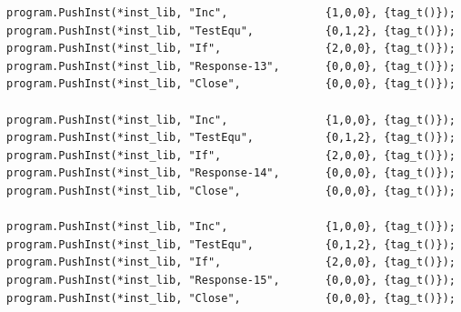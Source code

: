 \documentclass[
]{book}
\begin{document}
\begin{verbatim}
program.PushInst(*inst_lib, "Inc",               {1,0,0}, {tag_t()});
program.PushInst(*inst_lib, "TestEqu",           {0,1,2}, {tag_t()});
program.PushInst(*inst_lib, "If",                {2,0,0}, {tag_t()});
program.PushInst(*inst_lib, "Response-13",       {0,0,0}, {tag_t()});
program.PushInst(*inst_lib, "Close",             {0,0,0}, {tag_t()});

program.PushInst(*inst_lib, "Inc",               {1,0,0}, {tag_t()});
program.PushInst(*inst_lib, "TestEqu",           {0,1,2}, {tag_t()});
program.PushInst(*inst_lib, "If",                {2,0,0}, {tag_t()});
program.PushInst(*inst_lib, "Response-14",       {0,0,0}, {tag_t()});
program.PushInst(*inst_lib, "Close",             {0,0,0}, {tag_t()});

program.PushInst(*inst_lib, "Inc",               {1,0,0}, {tag_t()});
program.PushInst(*inst_lib, "TestEqu",           {0,1,2}, {tag_t()});
program.PushInst(*inst_lib, "If",                {2,0,0}, {tag_t()});
program.PushInst(*inst_lib, "Response-15",       {0,0,0}, {tag_t()});
program.PushInst(*inst_lib, "Close",             {0,0,0}, {tag_t()});
\end{verbatim}

  
\end{document}

